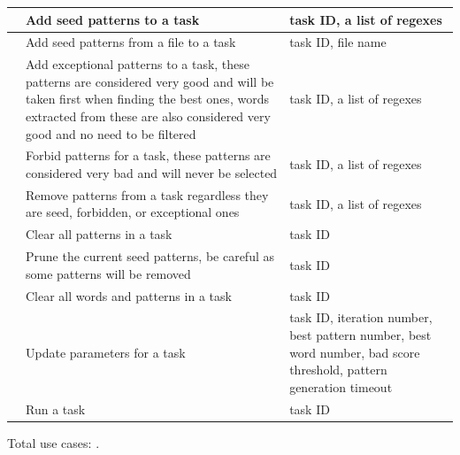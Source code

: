 \begin{footnotesize}
\begin{longtable}{|>{\raggedleft}p{}
			|>{\raggedright}p{}
			|>{\raggedright\arraybackslash}p{}|}
		\getCounter & Add seed patterns to a task & task ID, a list of regexes \\ \hline
		\getCounter & Add seed patterns from a file to a task & task ID, file name \\ \hline
		\getCounter & Add exceptional patterns to a task, these patterns are considered very good and will be taken first when finding the best ones, words extracted from these are also considered very good and no need to be filtered & task ID, a list of regexes \\ \hline
		\getCounter & Forbid patterns for a task, these patterns are considered very bad and will never be selected & task ID, a list of regexes \\ \hline
		\getCounter & Remove patterns from a task regardless they are seed, forbidden, or exceptional ones & task ID, a list of regexes \\ \hline
		\getCounter & Clear all patterns in a task & task ID \\ \hline
		\getCounter & Prune the current seed patterns, be careful as some patterns will be removed & task ID \\ \hline
		\getCounter & Clear all words and patterns in a task & task ID \\ \hline
		\getCounter & Update parameters for a task & task ID, iteration number, best pattern number, best word number, bad score threshold, pattern generation timeout \\ \hline
		\getCounter & Run a task & task ID
	\end{longtable}
\end{footnotesize}
\newcommand{\usecaseNumber}{}

Total use cases: \usecaseNumber.
